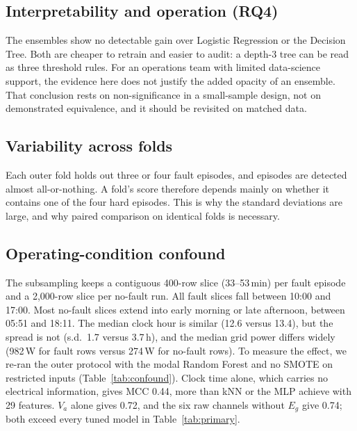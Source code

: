 \documentclass[11pt,a4paper]{article}
\begin{document}
\subsection{Interpretability and operation (RQ4)}

The ensembles show no detectable gain over Logistic Regression or the Decision Tree. Both are cheaper to retrain and easier to audit: a depth-3 tree can be read as three threshold rules. For an operations team with limited data-science support, the evidence here does not justify the added opacity of an ensemble. That conclusion rests on non-significance in a small-sample design, not on demonstrated equivalence, and it should be revisited on matched data.

\subsection{Variability across folds}

Each outer fold holds out three or four fault episodes, and episodes are detected almost all-or-nothing. A fold's score therefore depends mainly on whether it contains one of the four hard episodes. This is why the standard deviations are large, and why paired comparison on identical folds is necessary.

\subsection{Operating-condition confound}
\label{sec:confound}

The subsampling keeps a contiguous 400-row slice (33--53\,min) per fault episode and a 2{,}000-row slice per no-fault run. All fault slices fall between 10:00 and 17:00. Most no-fault slices extend into early morning or late afternoon, between 05:51 and 18:11. The median clock hour is similar (12.6 versus 13.4), but the spread is not (s.d.\ 1.7 versus 3.7\,h), and the median grid power differs widely (982\,W for fault rows versus 274\,W for no-fault rows). To measure the effect, we re-ran the outer protocol with the modal Random Forest and no SMOTE on restricted inputs (Table~\ref{tab:confound}). Clock time alone, which carries no electrical information, gives MCC 0.44, more than kNN or the MLP achieve with 29 features. $V_a$ alone gives 0.72, and the six raw channels without $E_g$ give 0.74; both exceed every tuned model in Table~\ref{tab:primary}.
\end{document}
